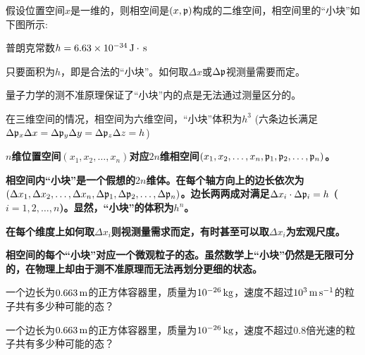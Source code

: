 \documentclass[CJK]{beamer}
\begin{document}
\begin{frame}
\bch
假设位置空间$x$是一维的，则相空间是$(x, {\mathfrak{p}})$构成的二维空间，相空间里的“小块”如下图所示:
\emini
{}
\bitem
\item{普朗克常数$h=6.63\times 10^{-34}\,\mathrm{J}\cdot\,\mathrm{s}$}
\item{只要面积为$h$，即是合法的“小块”。如何取$\Delta x$或$\Delta {\mathfrak{p}}$视测量需要而定。}
\item{量子力学的测不准原理保证了“小块”内的点是无法通过测量区分的。}
\eitem
\emini

\skipline

在三维空间的情况，相空间为六维空间，“小块”体积为$h^3$ (六条边长满足$\Delta {\mathfrak{p}}_x\Delta x =\Delta {\mathfrak{p}}_y\Delta y =\Delta {\mathfrak{p}}_z\Delta z = h$)
\ech
\end{frame}


\begin{frame}
\bch
{\large
\bitem
\item{\bf $n$维位置空间$(x_1, x_2, \ldots, x_n)$对应$2n$维相空间$(x_1, x_2, \ldots, x_n, {\mathfrak{p}}_1, {\mathfrak{p}}_2, \ldots, {\mathfrak{p}}_n)$。}
\item{\bf 相空间内“小块”是一个假想的$2n$维体。在每个轴方向上的边长依次为$(\Delta x_1, \Delta x_2, \ldots, \Delta x_n, \Delta {\mathfrak{p}}_1, \Delta {\mathfrak{p}}_2, \ldots, \Delta {\mathfrak{p}}_n)$。边长两两成对满足$\Delta x_i \cdot \Delta {\mathfrak{p}}_i = h$ ($i=1, 2, \ldots, n$)。显然，“小块”的体积为$h^n$。}
\item{\bf 在每个维度上如何取$\Delta x_i$则视测量需求而定，有时甚至可以取$\Delta x_i$为宏观尺度。}
\item{\bf 相空间的每个“小块”对应一个微观粒子的态。虽然数学上“小块”仍然是无限可分的，在物理上却由于测不准原理而无法再划分更细的状态。}
  \eitem
  }
\ech
\end{frame}

\begin{frame}
\bch
一个边长为$0.663\,\mathrm{m}$的正方体容器里，质量为$10^{-26}\,\mathrm{kg}$，速度不超过$10^3\,\mathrm{m}\,\mathrm{s}^{-1}$的粒子共有多少种可能的态？
\ech
\end{frame}

\begin{frame}
\bch
一个边长为$0.663\,\mathrm{m}$的正方体容器里，质量为$10^{-26}\,\mathrm{kg}$，速度不超过$0.8$倍光速的粒子共有多少种可能的态？
\ech
\end{frame}
\end{document}
